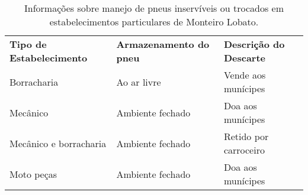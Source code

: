 \begin{table}[htbp]
  \centering
  \caption{Informações sobre manejo de pneus inservíveis ou trocados em estabelecimentos particulares de Monteiro Lobato.}
    \begin{tabular}{P{9.215em}|P{9.285em}|P{8.5em}}
     \textcolor[rgb]{ 1,  1,  1}{\textbf{Tipo de Estabelecimento}} & \textcolor[rgb]{ 1,  1,  1}{\textbf{Armazenamento do pneu }} & \textcolor[rgb]{ 1,  1,  1}{\textbf{Descrição do Descarte}} \\
     Borracharia & Ao ar livre & Vende aos munícipes \\
     Mecânico & Ambiente fechado & Doa aos munícipes \\
     Mecânico e borracharia & Ambiente fechado & Retido por carroceiro \\
     Moto peças & Ambiente fechado  & Doa aos munícipes \\
    \end{tabular}%
  \label{tab:pneus_monteiro}%
\end{table}%
